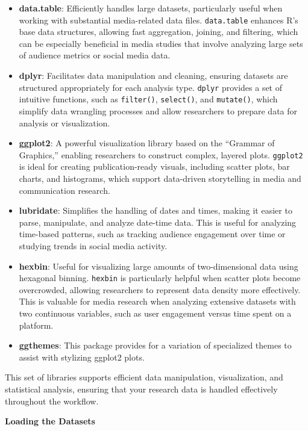 \documentclass[
]{book}
\begin{document}
\begin{itemize}
\item
  \textbf{data.table}: Efficiently handles large datasets, particularly useful when working with substantial media-related data files. \texttt{data.table} enhances R's base data structures, allowing fast aggregation, joining, and filtering, which can be especially beneficial in media studies that involve analyzing large sets of audience metrics or social media data.
\item
  \textbf{dplyr}: Facilitates data manipulation and cleaning, ensuring datasets are structured appropriately for each analysis type. \texttt{dplyr} provides a set of intuitive functions, such as \texttt{filter()}, \texttt{select()}, and \texttt{mutate()}, which simplify data wrangling processes and allow researchers to prepare data for analysis or visualization.
\item
  \textbf{ggplot2}: A powerful visualization library based on the ``Grammar of Graphics,'' enabling researchers to construct complex, layered plots. \texttt{ggplot2} is ideal for creating publication-ready visuals, including scatter plots, bar charts, and histograms, which support data-driven storytelling in media and communication research.
\item
  \textbf{lubridate}: Simplifies the handling of dates and times, making it easier to parse, manipulate, and analyze date-time data. This is useful for analyzing time-based patterns, such as tracking audience engagement over time or studying trends in social media activity.
\item
  \textbf{hexbin}: Useful for visualizing large amounts of two-dimensional data using hexagonal binning. \texttt{hexbin} is particularly helpful when scatter plots become overcrowded, allowing researchers to represent data density more effectively. This is valuable for media research when analyzing extensive datasets with two continuous variables, such as user engagement versus time spent on a platform.
\item
  \textbf{ggthemes}: This package provides for a variation of specialized themes to assist with stylizing ggplot2 plots.
\end{itemize}

This set of libraries supports efficient data manipulation, visualization, and statistical analysis, ensuring that your research data is handled effectively throughout the workflow.

\textbf{Loading the Datasets}
\end{document}
